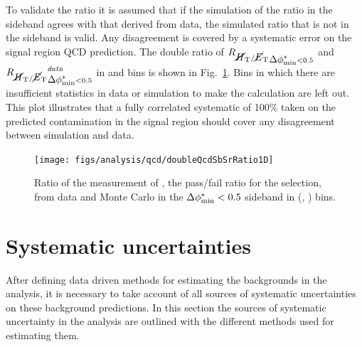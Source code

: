 To validate the ratio \rmhtmet it is assumed that if the simulation of
the ratio in the \bdphi sideband agrees with that derived from data,
the simulated ratio that is not in the sideband is valid. Any
disagreement is covered by a systematic error on the signal region QCD
prediction. The double ratio of $\mbox{$R_{\mbox{$\cancel{H}_\text{T}$} / \mbox{$\cancel{E}_\text{T}$}}$}_{\mbox{$\Delta\phi^{*}_{\rm min}$}<0.5}$ and
$\mbox{$R_{\mbox{$\cancel{H}_\text{T}$} / \mbox{$\cancel{E}_\text{T}$}}$}_{\mbox{$\Delta\phi^{*}_{\rm min}$}<0.5}^{data}$ in \scalht and \njet bins is shown in
Fig.~\ref{fig:RR_qcd}. Bins in which there are insufficient statistics
in data or simulation to make the calculation are left out. This plot
illustrates that a fully correlated systematic of 100\% taken on the
predicted \QCD contamination in the signal region should cover any
disagreement between simulation and data.

\begin{figure}[h!]
  \begin{center}        
    \texttt{[image: figs/analysis/qcd/doubleQcdSbSrRatio1D]}
    \caption{ Ratio of the measurement of \rmhtmet, the pass/fail
    ratio for the \mhtmet selection, from data and Monte Carlo in the
    $\mbox{$\Delta\phi^{*}_{\rm min}$} < 0.5$ sideband in (\scalht, \njet) bins.  }
    \label{fig:RR_qcd}
  \end{center} 
\end{figure}





\section{Systematic uncertainties} %
\label{sec:systematics}

After defining data driven methods for estimating the \SM backgrounds
in the analysis, it is necessary to take account of all sources of
systematic uncertainties on these background predictions. In this
section the sources of systematic uncertainty in the analysis are
outlined with the different methods used for estimating them.  

